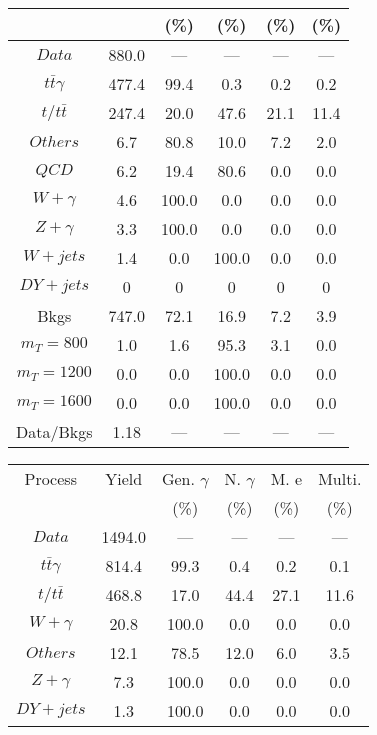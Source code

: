 \begin{figure}
\begin{minipage}[c]{0.32\textwidth}
{\begin{tabular}{cccccc}
 &  & (\%) & (\%) & (\%) & (\%)  \\
\hline
                                                                      $ Data $ &  880.0 &  --- &  --- &  --- &  ---\\
$ t\bar{t}\gamma $ &  477.4 &  99.4 &  0.3 &  0.2 &  0.2\\
$ t/t\bar{t} $ &  247.4 &  20.0 &  47.6 &  21.1 &  11.4\\
$ Others $ &  6.7 &  80.8 &  10.0 &  7.2 &  2.0\\
$ QCD $ &  6.2 &  19.4 &  80.6 &  0.0 &  0.0\\
$ W+\gamma $ &  4.6 &  100.0 &  0.0 &  0.0 &  0.0\\
$ Z+\gamma $ &  3.3 &  100.0 &  0.0 &  0.0 &  0.0\\
$ W+jets $ &  1.4 &  0.0 &  100.0 &  0.0 &  0.0\\
$ DY+jets $ &  0 &  0 &  0 &  0 &  0\\
Bkgs &  747.0 &  72.1 &  16.9 &  7.2 &  3.9\\
$ m_{T} = 800 $ &  1.0 &  1.6 &  95.3 &  3.1 &  0.0\\
$ m_{T} = 1200 $ &  0.0 &  0.0 &  100.0 &  0.0 &  0.0\\
$ m_{T} = 1600 $ &  0.0 &  0.0 &  100.0 &  0.0 &  0.0\\
Data/Bkgs &  1.18 &  --- &  --- &  --- &  ---\\
\hline
\end{tabular}
}
\end{minipage}
\begin{minipage}[c]{0.32\textwidth}
\centering
\tiny{
\begin{tabular}{cccccc}
\hline
Process & Yield & Gen. $\gamma$ & N. $\gamma$ & M. e & Multi. \\
 &  & (\%) & (\%) & (\%) & (\%)  \\
\hline
                                                                      $ Data $ &  1494.0 &  --- &  --- &  --- &  ---\\
$ t\bar{t}\gamma $ &  814.4 &  99.3 &  0.4 &  0.2 &  0.1\\
$ t/t\bar{t} $ &  468.8 &  17.0 &  44.4 &  27.1 &  11.6\\
$ W+\gamma $ &  20.8 &  100.0 &  0.0 &  0.0 &  0.0\\
$ Others $ &  12.1 &  78.5 &  12.0 &  6.0 &  3.5\\
$ Z+\gamma $ &  7.3 &  100.0 &  0.0 &  0.0 &  0.0\\
$ DY+jets $ &  1.3 &  100.0 &  0.0 &  0.0 &  0.0\\

\end{tabular}}
\end{minipage}
\end{figure}
